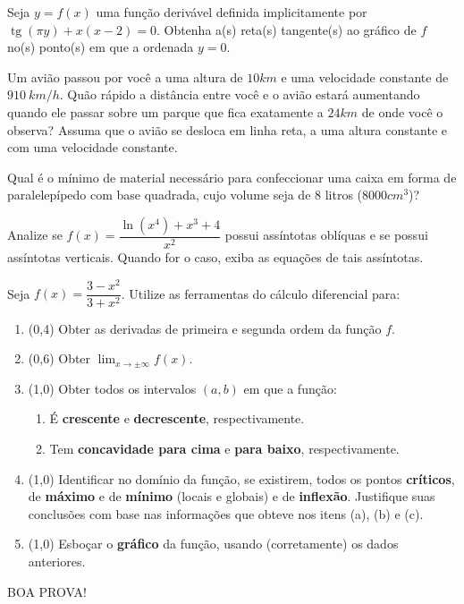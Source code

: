 \documentclass[12pt,a4paper]{article}
\newcommand{\fixme}{{\color{red}(...)}}
\newcommand*\tg{\operatorname{tg}}
\begin{document}
\begin{ExerciseList}
\Exercise[title={2,0}] Seja $y = f(x)$ uma função derivável definida implicitamente por $\tg(\pi y) + x(x - 2) = 0$. Obtenha a(s) reta(s) tangente(s) ao gráfico de $f$ no(s) ponto(s) em que a ordenada $y = 0$.
\Answer \fixme

\Exercise[title={2,0}] Um avião passou por você a uma altura de $10 km$ e uma velocidade constante de $910\ km/h$. Quão rápido a distância entre você e o avião estará aumentando quando ele passar sobre um parque que fica exatamente a $24 km$ de onde você o observa? Assuma que o avião se desloca em linha reta, a uma altura constante e com uma velocidade constante.
\Answer \fixme

\Exercise[title={2,0}] Qual é o mínimo de material necessário para confeccionar uma caixa em forma de paralelepípedo com base quadrada, cujo volume seja de $8$ litros ($8000 cm^3$)?
\Answer \fixme

\Exercise[title={2,0}] Analize se $f(x) = \dfrac{\ln(x^4) + x^3 + 4}{x^2}$ possui assíntotas oblíquas e se possui assíntotas verticais. Quando for o caso, exiba as equações de tais assíntotas.

\Exercise[title={4,0}] Seja $f(x) = \dfrac{3 - x^2}{3 + x^2}$. Utilize as ferramentas do cálculo diferencial para:
\begin{enumerate}
\item (0,4) Obter as derivadas de primeira e segunda ordem da função $f$.
\item (0,6) Obter $\lim_{x \to \pm\infty} f(x)$.
\item (1,0) Obter todos os intervalos $(a,b)$ em que a função:
\begin{enumerate}
\item É \textbf{crescente} e \textbf{decrescente}, respectivamente.
\item Tem \textbf{concavidade para cima} e \textbf{para baixo}, respectivamente.
\end{enumerate}
\item (1,0) Identificar no domínio da função, se existirem, todos os pontos \textbf{críticos}, de \textbf{máximo} e de \textbf{mínimo} (locais e globais) e de \textbf{inflexão}. Justifique suas conclusões com base nas informações que obteve nos itens (a), (b) e (c).
\item (1,0) Esboçar o \textbf{gráfico} da função, usando (corretamente) os dados anteriores.
\end{enumerate}
\Answer \fixme
\end{ExerciseList}

\begin{center}
BOA PROVA!
\end{center}

\end{document}
